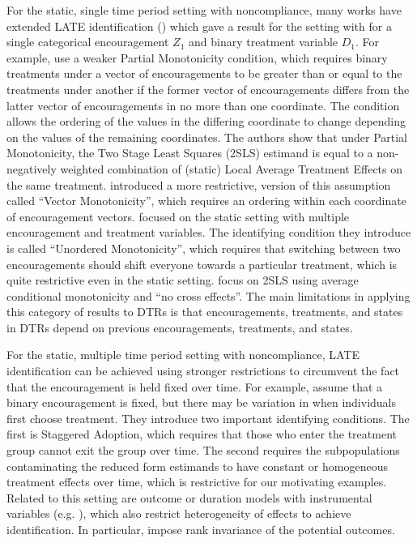 For the static, single time period setting with noncompliance, many works have extended LATE identification (\cite{imbens1994identification}) which gave a result for the setting with for a single categorical encouragement $Z_1$ and binary treatment variable $D_1$.
For example, \cite{mogstad2021causal,mogstad2024policy} use a weaker Partial Monotonicity condition, which requires binary treatments under a vector of encouragements to be greater than or equal to the treatments under another if the former vector of encouragements differs from the latter vector of encouragements in no more than one coordinate.
The condition allows the ordering of the values in the differing coordinate to change depending on the values of the remaining coordinates.
The authors show that under Partial Monotonicity, the Two Stage Least Squares (2SLS) estimand is equal to a non-negatively weighted combination of (static) Local Average Treatment Effects on the same treatment.
\cite{goff2020vector} introduced a more restrictive, version of this assumption called ``Vector Monotonicity'', which requires an ordering within each coordinate of encouragement vectors.
\cite{heckman2018unordered} focused on the static setting with multiple encouragement and treatment variables.
The identifying condition they introduce is called ``Unordered Monotonicity'', which requires that switching between two encouragements should shift everyone towards a particular treatment, which is quite restrictive even in the static setting.
\cite{bhuller20222sls} focus on 2SLS using average conditional monotonicity and ``no cross effects''.
The main limitations in applying this category of results to DTRs is that encouragements, treatments, and states in DTRs depend on previous encouragements, treatments, and states.

For the static, multiple time period setting with noncompliance, LATE identification can be achieved using stronger restrictions to circumvent the fact that the encouragement is held fixed over time.
For example, \cite{ferman2023identifying} assume that a binary encouragement is fixed, but there may be variation in when individuals first choose treatment.
They introduce two important identifying conditions.
The first is Staggered Adoption, which requires that those who enter the treatment group cannot exit the group over time.
The second requires the subpopulations contaminating the reduced form estimands to have constant or homogeneous treatment effects over time, which is restrictive for our motivating examples.
Related to this setting are outcome or duration models with instrumental variables (e.g. \cite{beyhum2023instrumental}), which also restrict heterogeneity of effects to achieve identification.
In particular, \cite{beyhum2023instrumental} impose rank invariance of the potential outcomes.

